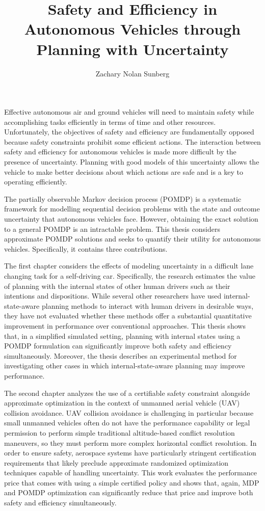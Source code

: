 \documentclass[12pt]{report}
\title{Safety and Efficiency in Autonomous Vehicles through Planning with Uncertainty}
\author{Zachary Nolan Sunberg}
\begin{document}
\beforepreface 


Effective autonomous air and ground vehicles will need to maintain safety while accomplishing tasks efficiently in terms of time and other resources.
Unfortunately, the objectives of safety and efficiency are fundamentally opposed because safety constraints prohibit some efficient actions.
The interaction between safety and efficiency for autonomous vehicles is made more difficult by the presence of uncertainty.
Planning with good models of this uncertainty allows the vehicle to make better decisions about which actions are safe and is a key to operating efficiently.

The partially observable Markov decision process (POMDP) is a systematic framework for modelling sequential decision problems with the state and outcome uncertainty that autonomous vehicles face.
However, obtaining the exact solution to a general POMDP is an intractable problem.
This thesis considers approximate POMDP solutions and seeks to quantify their utility for autonomous vehicles.
Specifically, it contains three contributions.

The first chapter considers the effects of modeling uncertainty in a difficult lane changing task for a self-driving car.
Specifically, the research estimates the value of planning with the internal states of other human drivers such as their intentions and dispositions.
While several other researchers have used internal-state-aware planning methods to interact with human drivers in desirable ways, they have not evaluated whether these methods offer a substantial quantitative improvement in performance over conventional approaches.
This thesis shows that, in a simplified simulated setting, planning with internal states using a POMDP formulation can significantly improve both safety and efficiency simultaneously.
Moreover, the thesis describes an experimental method for investigating other cases in which internal-state-aware planning may improve performance.

The second chapter analyzes the use of a certifiable safety constraint alongside approximate optimization in the context of unmanned aerial vehicle (UAV) collision avoidance.
UAV collision avoidance is challenging in particular because small unmanned vehicles often do not have the performance capability or legal permission to perform simple traditional altitude-based conflict resolution maneuvers, so they must perform more complex horizontal conflict resolution.
In order to ensure safety, aerospace systems have particularly stringent certification requirements that likely preclude approximate randomized optimization techniques capable of handling uncertainty.
This work evaluates the performance price that comes with using a simple certified policy and shows that, again, MDP and POMDP optimization can significantly reduce that price and improve both safety and efficiency simultaneously.
\end{document}
